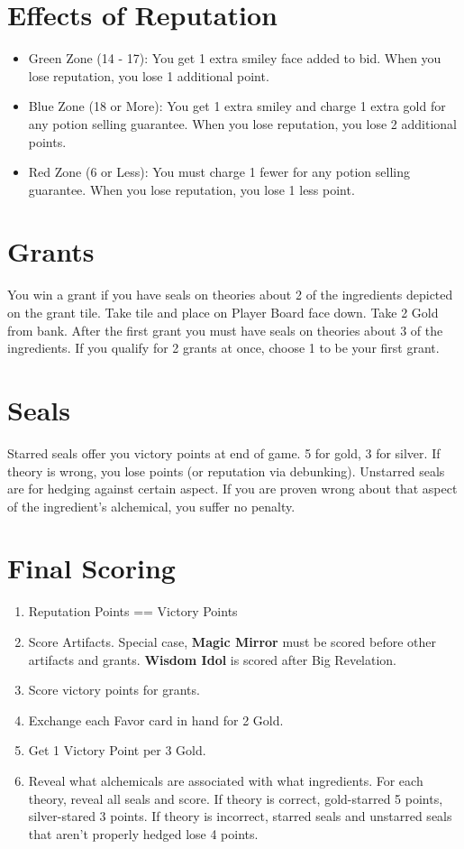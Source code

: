 \documentclass[12pt]{article}
\newenvironment{enumerateCustom}
{\begin{enumerate}
  \setlength{\itemsep}{1pt}
  \setlength{\parskip}{0pt}
  \setlength{\parsep}{0pt}}
{\end{enumerate}}
\newenvironment{itemizeCustom}
{\begin{itemize}
  \setlength{\itemsep}{1pt}
  \setlength{\parskip}{0pt}
  \setlength{\parsep}{0pt}}
{\end{itemize}}
\begin{document}
\begin{multicols*}{2}
\section*{Effects of Reputation}
\begin{itemizeCustom}
    \item Green Zone (14 - 17): You get 1 extra smiley face added to bid. When you lose reputation, you lose 1 additional point.
    \item Blue Zone (18 or More): You get 1 extra smiley and charge 1 extra gold for any potion selling guarantee. When you lose reputation, you lose 2 additional points.
    \item Red Zone (6 or Less): You must charge 1 fewer for any potion selling guarantee. When you lose reputation, you lose 1 less point.
\end{itemizeCustom}


\section*{Grants}
You win a grant if you have seals on theories about 2 of the ingredients depicted on the grant tile. Take tile and place on Player Board face down. Take 2 Gold from bank. After the first grant you must have seals on theories about 3 of the ingredients. If you qualify for 2 grants at once, choose 1 to be your first grant.

\section*{Seals}
Starred seals offer you victory points at end of game. 5 for gold, 3 for silver. If theory is wrong, you lose points (or reputation via debunking). Unstarred seals are for hedging against certain aspect. If you are proven wrong about that aspect of the ingredient's alchemical, you suffer no penalty.

\section*{Final Scoring}
\begin{enumerateCustom}
    \item Reputation Points == Victory Points
    \item Score Artifacts. Special case, \textbf{Magic Mirror} must be scored before other artifacts and grants. \textbf{Wisdom Idol} is scored after Big Revelation.
    \item Score victory points for grants.
    \item Exchange each Favor card in hand for 2 Gold.
    \item Get 1 Victory Point per 3 Gold.
    \item Reveal what alchemicals are associated with what ingredients. For each theory, reveal all seals and score. If theory is correct, gold-starred 5 points, silver-stared 3 points. If theory is incorrect, starred seals and unstarred seals that aren't properly hedged lose 4 points.
\end{enumerateCustom}


\end{multicols*}
\end{document}

